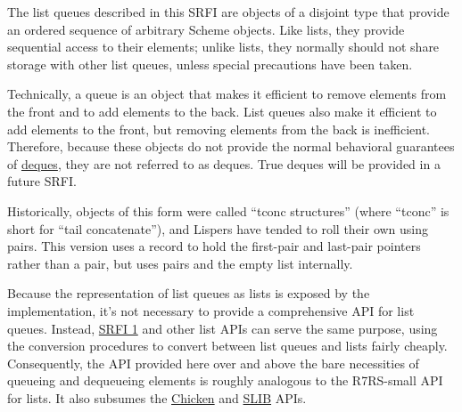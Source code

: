 The list queues described in this SRFI are objects of a disjoint type
that provide an ordered sequence of arbitrary Scheme objects. Like
lists, they provide sequential access to their elements; unlike lists,
they normally should not share storage with other list queues, unless
special precautions have been taken.

Technically, a queue is an object that makes it efficient to remove
elements from the front and to add elements to the back. List queues
also make it efficient to add elements to the front, but removing
elements from the back is inefficient. Therefore, because these objects
do not provide the normal behavioral guarantees of
\href{http://en.wikipedia.org/wiki/Double-ended_queue}{deques}, they are
not referred to as deques. True deques will be provided in a future
SRFI.

Historically, objects of this form were called ``tconc structures''
(where ``tconc'' is short for ``tail concatenate''), and Lispers have
tended to roll their own using pairs. This version uses a record to hold
the first-pair and last-pair pointers rather than a pair, but uses pairs
and the empty list internally.

Because the representation of list queues as lists is exposed by the
implementation, it's not necessary to provide a comprehensive API for
list queues. Instead,
\href{http://srfi.schemers.org/srfi-1/srfi-1.html}{SRFI 1} and other
list APIs can serve the same purpose, using the conversion procedures to
convert between list queues and lists fairly cheaply. Consequently, the
API provided here over and above the bare necessities of queueing and
dequeueing elements is roughly analogous to the R7RS-small API for
lists. It also subsumes the
\href{http://wiki.call-cc.org/man/4/Unit\%20data-structures\#queues}{Chicken}
and
\href{http://people.csail.mit.edu/jaffer/slib/Queues.html\#Queues}{​SLIB}
APIs.
